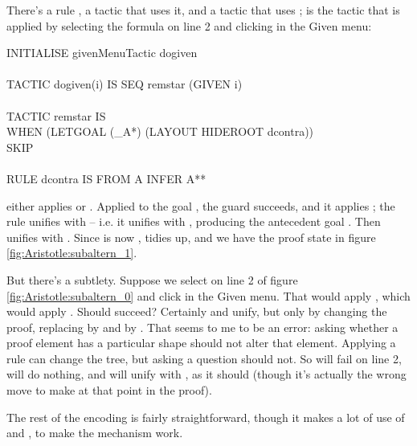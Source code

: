 There's a rule , a tactic  that uses it, and a tactic  that uses ;  is the tactic that is applied by selecting the formula on line 2 and clicking  in the Given menu:
\begin{japeish}
INITIALISE givenMenuTactic dogiven\\
\\
TACTIC dogiven(i) IS SEQ remstar (GIVEN i) \\
\\
TACTIC remstar IS \\
\tab  WHEN (LETGOAL (\_A*) (LAYOUT HIDEROOT dcontra))\\
\tab\tab\tab\tab       SKIP\\
\\       
RULE dcontra IS FROM A INFER A**
\end{japeish}
 either applies  or . Applied to the goal , the  guard succeeds, and it applies ; the rule unifies  with  -- i.e. it unifies  with , producing the antecedent goal . Then  unifies  with . Since  is now ,  tidies up, and we have the proof state in figure \ref{fig:Aristotle:subaltern_1}.

But there's a subtlety. Suppose we select  on line 2 of figure \ref{fig:Aristotle:subaltern_0} and click  in the Given menu. That would apply , which would apply . Should  succeed? Certainly  and  unify, but only by changing the proof, replacing  by  and  by . That seems to me to be an error: asking whether a proof element has a particular shape should not alter that element. Applying a rule can change the tree, but asking a question should not. So  will fail on line 2,  will do nothing, and  will unify  with , as it should (though it's actually the wrong move to make at that point in the proof).

The rest of the encoding is fairly straightforward, though it makes a lot of use of  and , to make the  mechanism work.
